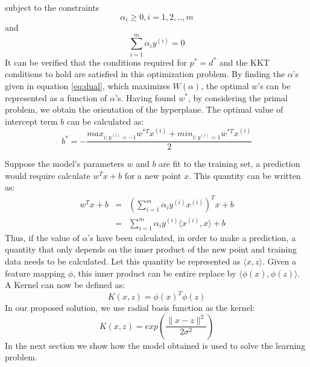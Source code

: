 \documentclass[%
        final,
        internal,
        notitlepage,
        narroweqnarray,
        inline,
        ]{ieee}
\begin{document}
subject to the constraints
\begin{equation}
\alpha_{i} \geq 0, i = 1,2,..,m
\end{equation}
and
\begin{equation}
\sum_{i=1}^{m} \alpha_{i}y^{(i)} = 0
\end{equation}
It can be verified that the conditions required for $p^*=d^*$ and the KKT conditions to hold are satisfied in this optimization problem.
By finding the $\alpha$'s given in equation \ref{eq:dual}, which maximizes $W(\alpha)$, the optimal $w$'s can be represented as a function of $\alpha$'s.
Having found $w^{*}$, by considering the primal problem, we obtain the orientation of the hyperplane.
The optimal value of intercept term $b$ can be calculated as:
\begin{equation}
b^{*} = - \frac {max_{i:y^{(i)}=-1}w^{*T}x^{(i)} + min_{i:y^{(i)}=1}w^{*T}x^{(i)}} {2}
\end{equation}

Suppose the model's parameters $w$ and $b$ are fit to the training set, a prediction would require calculate $w^Tx+b$ for a new point $x$. 
This quantity can be written as:
\begin{eqnarray}
w^Tx + b & = & \left( \sum_{i=1}^{m}\alpha_{i} y^{(i)} x^{(i)} \right)^Tx + b \\
         & = & \sum_{i=1}^{m} \alpha_{i}y^{(i)}\langle x^{(i)},x\rangle + b
\end{eqnarray}
Thus, if the value of $\alpha$'s have been calculated, in order to make a prediction, a quantity that only depends on the inner product of the new point and training data needs to be calculated.
Let this quantity be represented as $\langle x, z\rangle$.
Given a feature mapping $\phi$, this inner product can be entire replace by $\langle \phi(x),\phi(z) \rangle$.
A Kernel can now be defined as:
\begin{equation}
K(x,z) = \phi(x)^T\phi(z)
\end{equation}
In our proposed solution, we use radial basis function as the kernel:
\begin{equation}
K(x,z) = exp\left( \frac {\parallel x - z \parallel ^2} {2\sigma^2} \right)
\end{equation}
In the next section we show how the model obtained is used to solve the learning problem.


\end{document}

